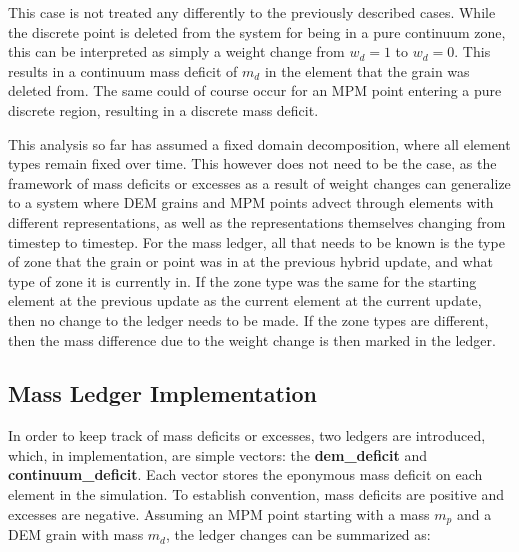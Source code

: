 This case is not treated any differently to the previously described cases. While the discrete point is deleted from the system for being in a pure continuum zone, this can be interpreted as simply a weight change from $w_d=1$ to $w_d=0$. This results in a continuum mass deficit of $m_d$ in the element that the grain was deleted from. The same could of course occur for an MPM point entering a pure discrete region, resulting in a discrete mass deficit.

This analysis so far has assumed a fixed domain decomposition, where all element types remain fixed over time. This however does not need to be the case, as the framework of mass deficits or excesses as a result of weight changes can generalize to a system where DEM grains and MPM points advect through elements with different representations, as well as the representations themselves changing from timestep to timestep. For the mass ledger, all that needs to be known is the type of zone that the grain or point was in at the previous hybrid update, and what type of zone it is currently in. If the zone type was the same for the starting element at the previous update as the current element at the current update, then no change to the ledger needs to be made. If the zone types are different, then the mass difference due to the weight change is then marked in the ledger.

\subsection{Mass Ledger Implementation}
In order to keep track of mass deficits or excesses, two ledgers are introduced, which, in implementation, are simple vectors: the \textbf{dem\_deficit} and \textbf{continuum\_deficit}. Each vector stores the eponymous mass deficit on each element in the simulation. To establish convention, mass deficits are positive and excesses are negative. Assuming an MPM point starting with a mass $m_p$ and a DEM grain with mass $m_d$, the ledger changes can be summarized as:

\def\Zones{\makecell[tl]{Discrete\\ Continuum\\ Hybrid\\ \\ Discrete\\ Continuum\\ Hybrid}}
\def\demdeficit{\textbf{dem\_deficit}}
\def\mpmdeficit{\textbf{mpm\_deficit}}

